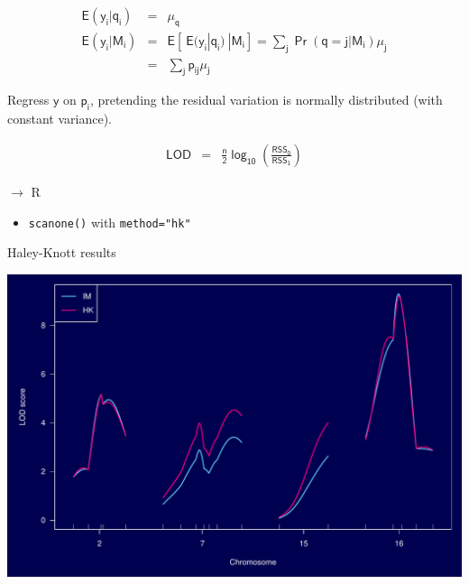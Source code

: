 \documentclass[12pt]{article}
\newcommand{\headsize}{\fontsize{35}{35} \selectfont}
\newcommand{\smallsize}{\fontsize{25}{30} \selectfont}
\newcommand{\smallersize}{\fontsize{20}{25} \selectfont}
\newcommand{\lod}{\text{LOD}}
\newcommand{\rss}{\text{RSS}}
\begin{document}
\smallersize

\begin{eqnarray*}
\mathsf{E(y_i | q_i)} & = & \mathsf{ \mu_q } \\[24pt]
\mathsf{E(y_i | M_i)} & = & \mathsf{E[ \ E(y_i|q_i) \ | M_i]}
 =  \mathsf{\textstyle{\sum_j \Pr(q=j|M_i) \mu_j}} \\[12pt]
& = & \mathsf{\textstyle{\sum_j p_{ij} \mu_j}}
\end{eqnarray*}

\vspace{1cm}

\hfill \begin{minipage}{10in}
\setlength{\rightskip}{0pt plus 1fil} %
{\color{mypink} Regress $\mathsf{y}$ on $\mathsf{p_i}$}, pretending the residual
variation is normally distributed (with constant variance).
\end{minipage}

\begin{eqnarray*}
\mathsf{\lod} & = & \mathsf{\frac{n}{2} \log_{10} \left( \frac{\rss_0}{\rss_1} \right)}
\end{eqnarray*}



\newpage

\headsize \color{myyellow}
$\boldsymbol{\rightarrow}$ R

\vspace{3cm}

\color{mywhite} \smallsize

\hfill \begin{minipage}[t]{9.5in}
\begin{itemize}
\itemsep24pt
\item \verb|scanone()| with \verb|method="hk"|
\end{itemize} \end{minipage}



\newpage

\headsize \color{myyellow}
\hfill \begin{minipage}{5.75in}
\centering
Haley-Knott results
\end{minipage}

\vfill

\centerline{\includegraphics{Figs/hk_lod.pdf}}
\end{document}
